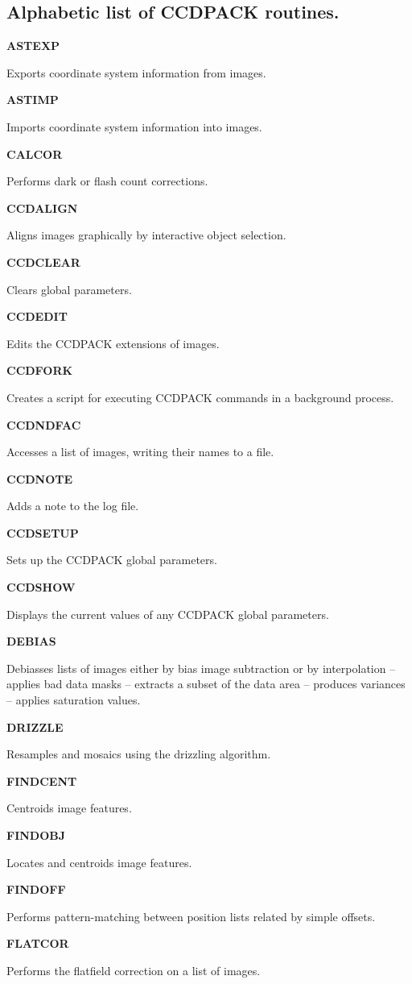 \documentclass[twoside,11pt]{article}
\newenvironment{latexonly}{}{}
\renewcommand{\_}{\texttt{\symbol{95}}}
\newcommand{\quickdes}[3]{
                         \parbox{1.1in}{\bf #1}
                         \parbox{4.4in}{\raggedright #2 \dotfill}
                         \parbox{0.6in}{\pageref{#3}}
                         \vspace*{0.2in}}
\newcommand{\latexonlysubsection}[1]{\subsection{#1}}
\newcommand{\latexonlysubsection}[1]{#1}
\begin{document}
\newpage
\begin{latexonly}
\latexonlysubsection{Alphabetic list of CCDPACK routines.}
%
%
\quickdes{ASTEXP}{Exports coordinate system information from images.}
         {ASTEXP}

\quickdes{ASTIMP}{Imports coordinate system information into images.}{ASTIMP}

\quickdes{CALCOR}{Performs dark or flash count corrections.}{CALCOR}

\quickdes{CCDALIGN}{Aligns images graphically by interactive object selection.}
         {CCDALIGN}

\quickdes{CCDCLEAR}{Clears global parameters.}
         {CCDCLEAR}


\quickdes{CCDEDIT}{Edits the CCDPACK extensions of images.}
         {CCDEDIT}

\quickdes{CCDFORK}{Creates a script for executing CCDPACK
                   commands in a background process.}{CCDFORK}

\quickdes{CCDNDFAC}{Accesses a list of images, writing their names to a file.}
         {CCDNDFAC}

\quickdes{CCDNOTE}{Adds a note to the log file.}{CCDNOTE}

\quickdes{CCDSETUP}{Sets up the CCDPACK global parameters.}{CCDSETUP}

\quickdes{CCDSHOW}{Displays the current values of any CCDPACK global
                   parameters.}{CCDSHOW}

\quickdes{DEBIAS}{Debiasses lists of images either by bias image
                 subtraction or by interpolation --
                 applies bad data masks --
                 extracts a subset of the data area --
                 produces variances --
                 applies saturation values.}
                 {DEBIAS}

\quickdes{DRIZZLE}{Resamples and mosaics using the drizzling algorithm.}
                  {DRIZZLE}

\quickdes{FINDCENT}{Centroids image features.}
                   {FINDCENT}

\quickdes{FINDOBJ}{Locates and centroids image features.}
                  {FINDOBJ}

\quickdes{FINDOFF}{Performs pattern-matching between position lists
                   related by simple offsets.}
                   {FINDOFF}

\newpage

\quickdes{FLATCOR}{Performs the flatfield correction on a list of images.}
                  {FLATCOR}


\end{latexonly}
\end{document}
